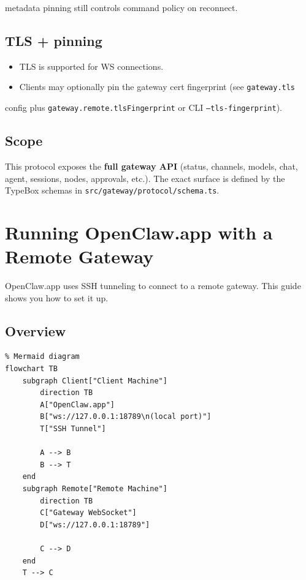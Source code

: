 metadata pinning still controls command policy on reconnect.

\subsection{TLS + pinning}


\begin{itemize}
  \item TLS is supported for WS connections.
  \item Clients may optionally pin the gateway cert fingerprint (see \texttt{gateway.tls}
\end{itemize}

config plus \texttt{gateway.remote.tlsFingerprint} or CLI \texttt{--tls-fingerprint}).

\subsection{Scope}


This protocol exposes the \textbf{full gateway API} (status, channels, models, chat,
agent, sessions, nodes, approvals, etc.). The exact surface is defined by the
TypeBox schemas in \texttt{src/gateway/protocol/schema.ts}.


\clearpage

\section{Running OpenClaw.app with a Remote Gateway}


OpenClaw.app uses SSH tunneling to connect to a remote gateway. This guide shows you how to set it up.

\subsection{Overview}


\begin{verbatim}
% Mermaid diagram
flowchart TB
    subgraph Client["Client Machine"]
        direction TB
        A["OpenClaw.app"]
        B["ws://127.0.0.1:18789\n(local port)"]
        T["SSH Tunnel"]

        A --> B
        B --> T
    end
    subgraph Remote["Remote Machine"]
        direction TB
        C["Gateway WebSocket"]
        D["ws://127.0.0.1:18789"]

        C --> D
    end
    T --> C
\end{verbatim}


